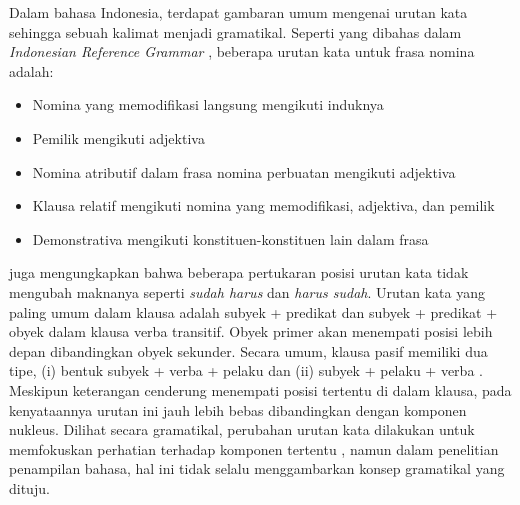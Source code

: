 Dalam bahasa Indonesia, terdapat gambaran umum mengenai urutan kata sehingga sebuah kalimat menjadi gramatikal. Seperti yang dibahas dalam \textit{Indonesian Reference Grammar} \citep{sneddon2010indonesian}, beberapa urutan kata untuk frasa nomina adalah:
\begin{itemize}
\item Nomina yang memodifikasi langsung mengikuti induknya
\item Pemilik mengikuti adjektiva
\item Nomina atributif dalam frasa nomina perbuatan mengikuti adjektiva
\item Klausa relatif mengikuti nomina yang memodifikasi, adjektiva, dan pemilik
\item Demonstrativa mengikuti konstituen-konstituen lain dalam frasa
\end{itemize}

\cite{sneddon2010indonesian} juga mengungkapkan bahwa beberapa pertukaran posisi urutan kata tidak mengubah maknanya seperti \textit{sudah harus} dan \textit{harus sudah}. Urutan kata yang paling umum dalam klausa adalah subyek + predikat dan subyek + predikat + obyek dalam klausa verba transitif. Obyek primer akan menempati posisi lebih depan dibandingkan obyek sekunder. Secara umum, klausa pasif memiliki dua tipe, (i) bentuk subyek + verba + pelaku dan (ii) subyek + pelaku + verba \citep{sneddon2010indonesian}. Meskipun keterangan cenderung menempati posisi tertentu di dalam klausa, pada kenyataannya urutan ini jauh lebih bebas dibandingkan dengan komponen nukleus. Dilihat secara gramatikal, perubahan urutan kata dilakukan untuk memfokuskan perhatian terhadap komponen tertentu \citep{sneddon2010indonesian}, namun dalam penelitian penampilan bahasa, hal ini tidak selalu menggambarkan konsep gramatikal yang dituju.

